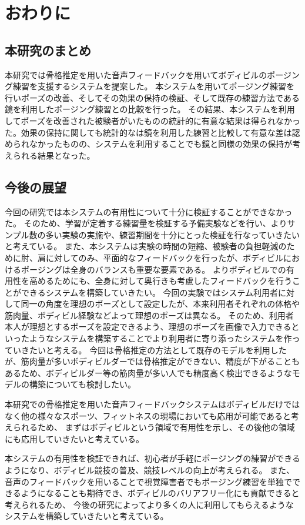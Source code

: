 \chapter{おわりに}
\label{conclusion}

\section{本研究のまとめ}
本研究では骨格推定を用いた音声フィードバックを用いてボディビルのポージング練習を支援するシステムを提案した。
本システムを用いてポージング練習を行いポーズの改善、そしてその効果の保持の検証、そして既存の練習方法である鏡を利用したポージング練習との比較を行った。
その結果、本システムを利用してポーズを改善された被験者がいたものの統計的に有意な結果は得られなかった。効果の保持に関しても統計的なは鏡を利用した練習と比較して有意な差は認められなかったものの、システムを利用することでも鏡と同様の効果の保持が考えられる結果となった。

\section{今後の展望}

今回の研究では本システムの有用性について十分に検証することができなかった。
そのため、学習が定着する練習量を検証する予備実験などを行い、よりサンプル数の多い実験の実施や、練習期間を十分にとった検証を行なっていきたいと考えている。
また、本システムは実験の時間の短縮、被験者の負担軽減のために肘、肩に対してのみ、平面的なフィードバックを行ったが、ボディビルにおけるポージングは全身のバランスも重要な要素である。
よりボディビルでの有用性を高めるためにも、全身に対して奥行きも考慮したフィードバックを行うことができるシステムを構築していきたい。
今回の実験ではシステム利用者に対して同一の角度を理想のポーズとして設定したが、本来利用者それぞれの体格や筋肉量、ボディビル経験などよって理想のポーズは異なる。
そのため、利用者本人が理想とするポーズを設定できるよう、理想のポーズを画像で入力できるといったようなシステムを構築することでより利用者に寄り添ったシステムを作っていきたいと考える。
今回は骨格推定の方法として既存のモデルを利用したが、筋肉量が多いボディビルダーでは骨格推定ができない、精度が下がることもあるため、ボディビルダー等の筋肉量が多い人でも精度高く検出できるようなモデルの構築についても検討したい。

本研究での骨格推定を用いた音声フィードバックシステムはボディビルだけではなく他の様々なスポーツ、フィットネスの現場においても応用が可能であると考えられるため、
まずはボディビルという領域で有用性を示し、その後他の領域にも応用していきたいと考えている。

本システムの有用性を検証できれば、初心者が手軽にポージングの練習ができるようになり、ボディビル競技の普及、競技レベルの向上が考えられる。
また、音声のフィードバックを用いることで視覚障害者でもポージング練習を単独でできるようになることも期待でき、ボディビルのバリアフリー化にも貢献できると考えられるため、
今後の研究によってより多くの人に利用してもらえるようなシステムを構築していきたいと考えている。
